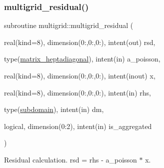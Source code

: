 \subsubsection{\texorpdfstring{multigrid\+\_\+residual()}{multigrid\_residual()}}
{\footnotesize\ttfamily subroutine multigrid\+::multigrid\+\_\+residual (\begin{DoxyParamCaption}\item[{real(kind=8), dimension(0\+:,0\+:,0\+:), intent(out)}]{rsd,  }\item[{type(\hyperlink{structmatrix_1_1matrix__heptadiagonal}{matrix\+\_\+heptadiagonal}), intent(in)}]{a\+\_\+poisson,  }\item[{real(kind=8), dimension(0\+:,0\+:,0\+:), intent(inout)}]{x,  }\item[{real(kind=8), dimension(0\+:,0\+:,0\+:), intent(in)}]{rhs,  }\item[{type(\hyperlink{structgeometry_1_1subdomain}{subdomain}), intent(in)}]{dm,  }\item[{logical, dimension(0\+:2), intent(in)}]{is\+\_\+aggregated }\end{DoxyParamCaption})}



Residual calculation. rsd = rhs -\/ a\+\_\+poisson $\ast$ x. 



